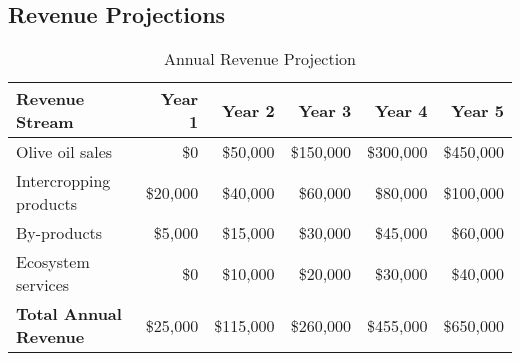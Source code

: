 \subsection{Revenue Projections}

\begin{table}[h]
\centering
\begin{tabular}{|l|r|r|r|r|r|}
\hline
\textbf{Revenue Stream} & \textbf{Year 1} & \textbf{Year 2} & \textbf{Year 3} & \textbf{Year 4} & \textbf{Year 5} \\
\hline
Olive oil sales & \$0 & \$50,000 & \$150,000 & \$300,000 & \$450,000 \\
Intercropping products & \$20,000 & \$40,000 & \$60,000 & \$80,000 & \$100,000 \\
By-products & \$5,000 & \$15,000 & \$30,000 & \$45,000 & \$60,000 \\
Ecosystem services & \$0 & \$10,000 & \$20,000 & \$30,000 & \$40,000 \\
\hline
\textbf{Total Annual Revenue} & \$25,000 & \$115,000 & \$260,000 & \$455,000 & \$650,000 \\
\hline
\end{tabular}
\caption{Annual Revenue Projection}
\end{table}

